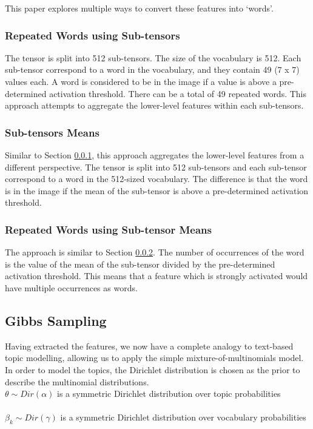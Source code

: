 \documentclass{article}
\newcommand\tab[1][1cm]{\hspace*{#1}}
\begin{document}
This paper explores multiple ways to convert these features into `words'.

\subsubsection{Repeated Words using Sub-tensors}\label{repeatedSubtensor}
The tensor is split into 512 sub-tensors. The size of the vocabulary is 512. Each sub-tensor correspond to a word in the vocabulary, and they contain 49 (7 x 7) values each. A word is considered to be in the image if a value is above a pre-determined activation threshold. There can be a total of 49 repeated words. This approach attempts to aggregate the lower-level features within each sub-tensors.

\subsubsection{Sub-tensors Means}\label{meanSubtensor}
Similar to Section \ref{repeatedSubtensor}, this approach aggregates the lower-level features from a different perspective. The tensor is split into 512 sub-tensors and each sub-tensor correspond to a word in the 512-sized vocabulary. The difference is that the word is in the image if the mean of the sub-tensor is above a pre-determined activation threshold.

\subsubsection{Repeated Words using Sub-tensor Means}\label{repeatedmeanSubtensor}
The approach is similar to Section \ref{meanSubtensor}. The number of occurrences of the word is the value of the mean of the sub-tensor divided by the pre-determined activation threshold. This means that a feature which is strongly activated would have multiple occurrences as words. 

\subsection{Gibbs Sampling}
Having extracted the features, we now have a complete analogy to text-based topic modelling, allowing us to apply the simple mixture-of-multinomials model. In order to model the topics, the Dirichlet distribution is chosen as the prior to describe the multinomial distributions. \\
\newline
\tab $\theta \sim Dir(\alpha)$ is a symmetric Dirichlet distribution over topic probabilities \\
\\
\tab $\beta_k \sim Dir(\gamma)$ is a symmetric Dirichlet distribution over vocabulary probabilities \\
\end{document}
